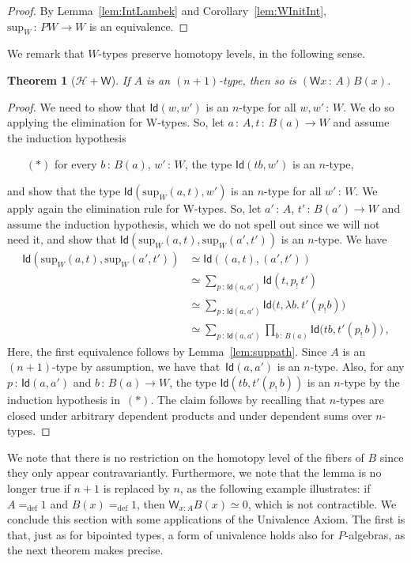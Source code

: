 \documentclass[10pt,a4paper,oneside,reqno]{amsart}
\theoremstyle{mythm}
\newtheorem{theorem}{Theorem}[section]
\theoremstyle{mydef}
\theoremstyle{myrmk}
\newcommand{\defeq}{=_{\mathrm{def}}}
\newcommand{\co}{\,{:}\,}
\newcommand{\Hint}{\mathcal{H}}
\newcommand{\Id}{\mathsf{Id}}
\newcommand{\W}{\mathsf{W}}
\renewcommand{\sup}{\mathrm{sup}}
\begin{document}
\begin{proof}
By Lemma~\ref{lem:IntLambek} and Corollary~\ref{lem:WInitInt}, $\sup_W \co PW \to W$ is an equivalence.
\end{proof}





We  remark that $W$-types  preserve homotopy levels, in the following sense.

\begin{theorem}[$\Hint + \W$]
If $A$ is an $(n+1)$-type, then so is $(\W x \co A) B(x)$.
\end{theorem}


\begin{proof}
We need to show that $\Id(w, w')$ is an $n$-type for all $w, w' \co W$. We do so applying the elimination for W-types.
So, let $a \co A, t \co B(a) \to W$ and assume the induction hypothesis 
\begin{itemize}
\item[$(\ast)$] for every $b \co B(a)$, $w' \co W$, the type $\Id(tb,w')$ is an $n$-type, 
\end{itemize}
and show that  the type $\Id(\sup_W(a,t), w')$ is an $n$-type for all $w' \co W$. We apply again the elimination rule for W-types. So, let   $a' \co A$, $t' \co B(a') \to W$ and assume the induction hypothesis, which we do not spell out since we will not need it, and show that $\Id( \sup_W(a,t) , \sup_W(a',t'))$ is an $n$-type. We have
\begin{align*} 
\Id(\sup_W(a,t), \sup_W(a',t'))
& \simeq \Id((a,t) , (a',t')) \\
& \simeq \sum_{p \co \Id(a, a')} \Id( t , p_{!} \, t' )   \\
& \simeq \sum_{p \co \Id(a,a')}  \Id\big(t, \lambda b. \,  t'( p_{!} b)\big) \\
& \simeq \sum_{p \co \Id(a,a')} \prod_{b \co B(a)} \Id \big( tb , t'(p_{!} \, b)\big) \, , 
\end{align*}
Here, the first equivalence follows by Lemma~\ref{lem:suppath}. Since $A$ is an $(n+1)$-type by assumption, we have 
that~$\Id(a,a')$ is an $n$-type. Also, for any $p \co \Id(a,a')$ and $b \co B(a) \to W$, the type $\Id(tb,  t'(p_{!} \, b))$ is an $n$-type by the 
induction 
hypothesis in~$(\ast)$. The claim follows by recalling that $n$-types are closed under arbitrary dependent products and under dependent 
sums over $n$-types. 
\end{proof}

We note that there is no restriction on the homotopy level of the fibers of $B$ since they only appear contravariantly. Furthermore, we note that the lemma is no longer true if $n+1$ is replaced by $n$, as the following example
illustrates: if $A \defeq 1$ and $B(x) \defeq 1$, then $\W_{x:A} B(x) \simeq 0$, which is not contractible. 
We conclude this section with some applications of the Univalence Axiom. The first is that, just as for bipointed 
types, a form of univalence holds also for $P$-algebras, as the next theorem makes precise. 
\end{document}
